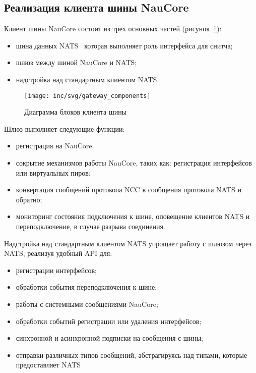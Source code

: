 \subsection{Реализация клиента шины NauCore}

Клиент шины NauCore состоит из трех основных частей (рисунок~\ref{pic:gateway:components}):
\begin{itemize}
    \item шина данных NATS~%
    которая выполняет роль интерфейса для снитча; %
    \item шлюз между шиной NauCore и NATS;
    \item надстройка над стандартным клиентом NATS\@.
\end{itemize}

\begin{figure}[ht]
    \centering
    \texttt{[image: inc/svg/gateway\_components]}
    \caption{Диаграмма блоков клиента шины}
    \label{pic:gateway:components}
\end{figure}

Шлюз выполняет следующие функции:
\begin{itemize}
    \item регистрация на NauCore
    \item сокрытие механизмов работы NauCore, таких как: регистрация интерфейсов или виртуальных пиров;
    \item конвертация сообщений протокола NCC в сообщения протокола NATS и обратно; %
    \item мониторинг состояния подключения к шине, оповещение клиентов NATS и переподключение, в случае разрыва соединения. %
\end{itemize}

Надстройка над стандартным клиентом NATS упрощает работу с шлюзом через NATS,
реализуя удобный API для:
\begin{itemize}
    \item регистрации интерфейсов;
    \item обработки события переподключения к шине;
    \item работы с системными сообщениями NauCore;
    \item обработки событий регистрации или удаления интерфейсов;
    \item синхронной и асинхронной подписки на сообщения с шины;
    \item отправки различных типов сообщений, абстрагируясь над типами, которые предоставляет NATS\@
\end{itemize}

